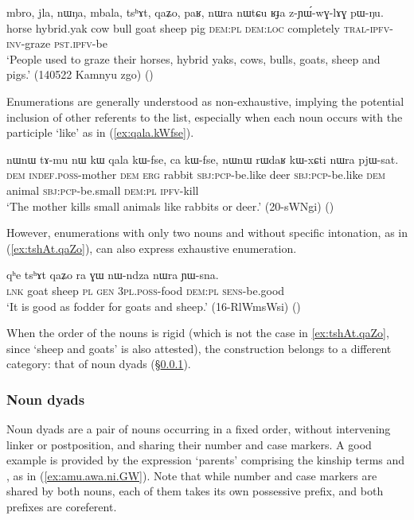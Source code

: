 \begin{exe}
\ex \label{ex:mbro.etc}
 \gll mbro, jla, nɯŋa, mbala, tsʰɤt, qaʑo, paʁ, nɯra nɯtɕu ʁɟa z-ɲɯ́-wɣ-lɤɣ pɯ-ŋu. \\
 horse hybrid.yak cow bull goat sheep pig \textsc{dem}:\textsc{pl} \textsc{dem}:\textsc{loc} completely \textsc{tral}-\textsc{ipfv}-\textsc{inv}-graze \textsc{pst}.\textsc{ipfv}-be \\
\glt `People used to graze their horses, hybrid yaks, cows, bulls, goats, sheep and pigs.' (140522 Kamnyu zgo)
()
\end{exe}

Enumerations are generally understood as non-exhaustive, implying the potential inclusion of other referents to the list, especially when each noun occurs with the participle  `like' as in (\ref{ex:qala.kWfse}).

\begin{exe}
\ex \label{ex:qala.kWfse}
 \gll  nɯnɯ tɤ-mu nɯ kɯ qala kɯ-fse, ca kɯ-fse, nɯnɯ rɯdaʁ kɯ-xɕti nɯra pjɯ-sat. \\
\textsc{dem} \textsc{indef}.\textsc{poss}-mother \textsc{dem} \textsc{erg} rabbit \textsc{sbj}:\textsc{pcp}-be.like deer \textsc{sbj}:\textsc{pcp}-be.like  \textsc{dem} animal \textsc{sbj}:\textsc{pcp}-be.small \textsc{dem}:\textsc{pl} \textsc{ipfv}-kill \\
\glt `The mother kills small animals like rabbits or deer.' (20-sWNgi)
()
\end{exe}

However, enumerations with only two  nouns and without specific intonation, as in (\ref{ex:tshAt.qaZo}), can also express exhaustive enumeration.  

\begin{exe}
\ex \label{ex:tshAt.qaZo}
 \gll  qʰe tsʰɤt qaʑo ra ɣɯ nɯ-ndza nɯra ɲɯ-sna.  \\
 \textsc{lnk} goat sheep \textsc{pl} \textsc{gen} \textsc{3pl}.\textsc{poss}-food \textsc{dem}:\textsc{pl} \textsc{sens}-be.good \\
\glt `It is good as fodder for goats and sheep.' (16-RlWmsWsi)
()
\end{exe}

When the order of the nouns is rigid (which is not the case in \ref{ex:tshAt.qaZo}, since  `sheep and goats' is also attested), the construction belongs to a different category: that of noun dyads (§\ref{sec:dyads}).

\subsubsection{Noun dyads} \label{sec:dyads}
Noun dyads are a pair of nouns occurring in a fixed order, without intervening linker or postposition, and sharing their number and case markers. A good example is provided by the expression `parents' comprising the kinship terms  and , as in (\ref{ex:amu.awa.ni.GW}). Note that while number and case markers are shared by both nouns, each of them takes its own possessive prefix, and both prefixes are coreferent. 


